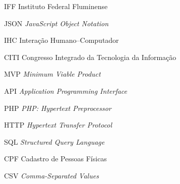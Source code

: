 \begin{siglas}
  \item[IFF] Instituto Federal Fluminense
  \item[JSON] \textit{JavaScript Object Notation}
  \item[IHC] Interação Humano–Computador
  \item[CITI] Congresso Integrado da Tecnologia da Informação
  \item[MVP] \textit{Minimum Viable Product}
  \item[API] \textit{Application Programming Interface}
  \item[PHP] \textit{PHP: Hypertext Preprocessor}
  \item[HTTP] \textit{Hypertext Transfer Protocol}
  \item[SQL] \textit{Structured Query Language}
  \item[CPF] Cadastro de Pessoas Físicas
  \item[CSV] \textit{Comma-Separated Values}
\end{siglas}